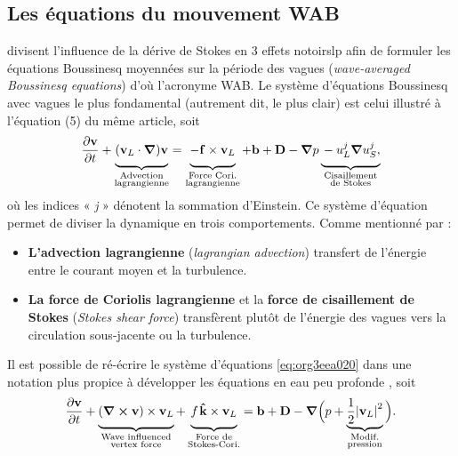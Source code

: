 \documentclass[10pt]{report}
\numberwithin{equation}{section}
\newcommand{\kvf}{\vb{\hat{k}}}
\newcommand{\vv}{\vb{v}}
\newcommand{\grande}{\vphantom{\frac{1}{xx}}}
\newcommand{\pt}{\hspace{1pt}} %
\begin{document}
\subsection{Les équations du mouvement WAB}
\label{sec:orgbf1cf0b}

\textcite{suzuki2016understanding} divisent l'influence de la dérive de Stokes en 3 effets notoirslp afin de formuler les équations Boussinesq moyennées sur la période des vagues (\emph{wave-averaged Boussinesq equations}) d'où l'acronyme WAB.
Le système d'équations Boussinesq avec vagues le plus fondamental (autrement dit, le plus clair) est celui illustré à l'équation (5) du même article, soit
\begin{equation}
\label{eq:org3eea020}
   \pdv{\vv}{t}
   +\underbrace{\qty( \vv_L\cdot\gradient{})\vv\grande}_{\substack{\text{Advection}\\\text{lagrangienne}}}
   = \underbrace{-\grande\vb{f}\times\vv_L}_{\substack{\text{Force Cori.}\\\text{lagrangienne}}}
   +\vb{b} + \vb{D} - \gradient p
   \underbrace{\grande- u_L^j\gradient{u_S^j},}_{\substack{\text{Cisaillement}\\\text{de Stokes}}}
\end{equation}
où les indices « \emph{j} » dénotent la sommation d'Einstein.
Ce système d'équation permet de diviser la dynamique en trois comportements. 
Comme mentionné par  :

\begin{itemize}
\item \textbf{L'advection lagrangienne} (\emph{lagrangian advection}) transfert de l'énergie entre le courant moyen et la turbulence.
\item \textbf{La force de Coriolis lagrangienne} et la \textbf{force de cisaillement de Stokes} (\emph{Stokes shear force}) transfèrent plutôt de l'énergie des vagues vers la circulation sous-jacente ou la turbulence.
\end{itemize}

Il est possible de ré-écrire le système d'équations \ref{eq:org3eea020} dans une notation plus propice à développer les équations en eau peu profonde \autocite[Voir][équation 1]{suzuki2016understanding}, soit
\begin{equation}
   \pdv{\vv}{t}
   +\underbrace{\grande\qty(\curl{\vv}) \times \vv_L}_{\substack{\text{Wave influenced}\\ \text{vertex force}}}
   +\underbrace{\grande f\pt\kvf\times \vv_L}_{\substack{\text{Force de}\\\text{Stokes-Cori.}}}
   = \vb{b} + \vb{D} -\gradient{}\Big( p + \underbrace{\frac{1}{2}\abs{\vv_L}^2}_{\substack{\text{Modif.}\\\text{pression}}}\Big).
\end{equation}
\end{document}
